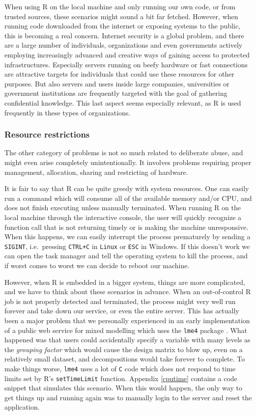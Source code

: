 \documentclass[article]{jss}
\newcommand{\R}{\textsf{R}\xspace}
\newcommand{\Linux}{\texttt{Linux}\xspace}
\begin{document}
When using \R on the local machine and only running our own code, or
from trusted sources, these scenarios might sound a bit far fetched. However,
when running code downloaded from the internet or exposing systems to the
public, this is becoming a real concern. Internet security is a global problem,
and there are a large number of individuals, organizations and even governments
actively employing increasingly advanced and creative ways of gaining access to
protected infrastructures. Especially servers running on beefy hardware or
fast connections are attractive targets for individuals that could use these
resources for other purposes. But also servers and users inside large companies,
universities or government institutions are frequently targeted with the goal
of gathering confidential knowledge. This last aspect seems especially
relevant, as \R is used frequently in these types of organizations.

\subsubsection{Resource restrictions}

The other category of problems is not so much related to deliberate abuse, and
might even arise completely unintentionally. It involves problems requiring
proper management, allocation, sharing and restricting of hardware. 

It is fair to say that \R can be quite greedy with system resources.
One can easily run a command which will consume all of the available memory
and/or CPU, and does not finish executing unless manually terminated. When
running \R on the local machine through the interactive console, the
user will quickly recognize a function call that is not returning timely or is
making the machine unresponsive. When this happens, we can easily interrupt the
process prematurely by sending a \texttt{SIGINT}, i.e.\ pressing \texttt{CTRL+C}
in \Linux or \texttt{ESC} in Windows. If this doesn't work we can open the task
manager and tell the operating system to kill the process, and if worst comes
to worst we can decide to reboot our machine.

However, when \R is embedded in a bigger system, things are
more complicated, and we have to think about these scenarios in advance. When
an out-of-control \R job is not properly detected and terminated, the process
might very well run forever and take down our service, or even the entire server. This has
actually been a major problem that we personally experienced in an early
implementation of a public web service for mixed modelling \citep{yeroonlme4}
which uses the \texttt{lme4} package \citep{lme4}. What happened was that users
could accidentally specify a variable with many levels as the \emph{grouping
factor} which would cause the design matrix to blow up, even on a relatively
small dataset, and decompositions would take forever to complete. To make
things worse, \texttt{lme4} uses a lot of \texttt{C} code which does not
respond to time limits set by R's \texttt{setTimeLimit} function. Appendix
\ref{cputime} contains a code snippet that simulates this scenario. When this
would happen, the only way to get things up and running again was to manually
login to the server and reset the application.
\end{document}
